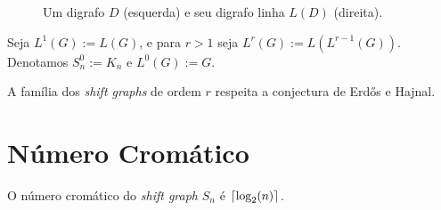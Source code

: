 \begin{figure}[H]
\centering
{}
\caption{Um digrafo $D$ (esquerda) e seu digrafo linha $L(D)$ (direita).}
\label{fig:shiftlinedigraph}
\end{figure}

Seja $L^1(G) := L(G)$, e para $r>1$ seja $L^r(G) := L(L^{r-1}(G))$. Denotamos $S_n^0 := K_n$ e $L^0(G) := G$. 

\begin{teorema}\label{shiftteo}
A família dos \textit{shift graphs} de ordem $r$ respeita a conjectura de Erd\H{o}s e Hajnal. \cite{gabor2018cepa}
\end{teorema}

\section{Número Cromático}

\begin{afirmacao}\label{shiftchraff1}
O número cromático do \textit{shift graph} $S_n$ é $\lceil\log_2(n)\rceil$.
\end{afirmacao}

